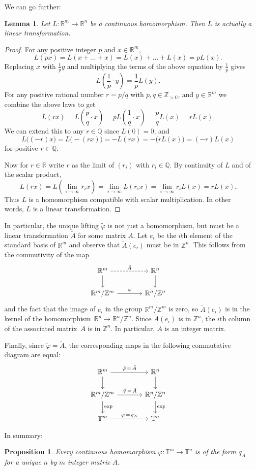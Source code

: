 \documentclass[12pt]{amsart}
\theoremstyle{plain}
\newtheorem{proposition}[theorem]{Proposition}
\newtheorem{lemma}[theorem]{Lemma}
\theoremstyle{definition}
\theoremstyle{remark}
\numberwithin{theorem}{section}
\numberwithin{equation}{section} %
\newcommand{\bZ}{{\mathbb{Z}}}
\newcommand{\bR}{{\mathbb{R}}}
\newcommand{\bQ}{{\mathbb{Q}}}
\newcommand{\torus}{{\mathbb{T}}}
\begin{document}
We can go further:

\begin{lemma}
Let $L\colon \bR^m \to \bR^n$ be a continuous homomorphism.
Then $L$ is actually a linear transformation.
\end{lemma}

\begin{proof}
For any positive integer $p$ and $x \in \bR^m$,
$$
L(p x) = L(x+ \ldots + x) = L(x) + \ldots + L(x) = p L(x).
$$
Replacing $x$ with $\frac 1 p y$ and multiplying the terms of the above equation by $\frac 1 p$ gives
$$
L\left ( \frac 1 p \cdot y\right) = \frac 1 p L(y).
$$
For any positive rational number $r = p/q$ with $p, q \in \bZ_{>0}$, and $y \in \bR^m$ we combine
the above laws to get
$$
L (r x) = L \left( \frac p q \cdot x \right) = p L  \left( \frac 1 q \cdot x \right) = \frac p q L(x) = r L(x).
$$
We can extend this to any $r \in \bQ$ since $L(0) = 0$, and 
$$L\big((-r) x\big) = L\big(-(rx)\big) = - L(r x) = - \big( r L(x) \big) = (-r) L(x)$$ for positive $r \in \bQ$.

Now for $r\in\bR$ write $r$ as the limit of $(r_i)$ with $r_i \in \bQ$. By continuity of $L$ and of the scalar product,
$$
L( r x) =L \left(  \lim_{i \to \infty}  r_i x \right) = \lim_{i \to \infty}  L(r_i x) = \lim_{i \to \infty}  r_i L(x)  = r L(x).
$$
Thus $L$  is a homomorphism compatible with scalar multiplication. In other words, $L$ is a linear transformation.
\end{proof}

In particular, the unique lifting $\tilde \varphi$ is not just a homomorphism, but must be a linear transformation $\tilde A$ for some matrix $A$.
Let $e_i$ be the $i$th element of the standard basis of $\bR^m$ and observe that $\tilde A(e_i)$ must be in $\bZ^n$.
This follows from the commutivity of the map
 $$
 \begin{tikzcd} [column sep = large]
\bR^m  \arrow[r, dashed, "\tilde A"]  \arrow[d] & \bR^n \arrow[d]    \\
\bR^m/\bZ^m  \arrow[r, "\bar \varphi"] & \bR^n/\bZ^n 
\end{tikzcd}
$$
and the fact that the image of $e_i$ in the group $\bR^m / \bZ^m$ is zero, so $\tilde A(e_i)$ is in the kernel of the homomorphism~$\bR^n \to \bR^n/\bZ^n$.
Since $\tilde A(e_i)$ is in $\bZ^n$, the $i$th column of the associated matrix~$A$ is in $\bZ^n$. In particular, $A$ is an integer matrix. 

Finally, since $\tilde \varphi = \tilde A$, the  corresponding maps in the following commutative diagram are equal:
 $$
 \begin{tikzcd} [column sep = large]
\bR^m  \arrow[r, "\tilde\varphi \, = \,  \tilde A"]  \arrow[d] & \bR^n \arrow[d]    \\
\bR^m/\bZ^m  \arrow[r, "\bar \varphi \, = \,  \bar A "]  \arrow[d, "\mathrm{exp}"] & \bR^n/\bZ^n  \arrow[d, "\mathrm{exp}"]   \\
\torus^m  \arrow[r,  "\varphi \, = \,  q_A"]  & \torus^n    
\end{tikzcd}
$$

In summary:
\begin{proposition}
Every continuous homomorphism $\varphi \colon \torus^m \to \torus^n$ is of the form $q_A$ for a unique $n$ by $m$ integer matrix $A$.
\end{proposition}




 
\end{document}
